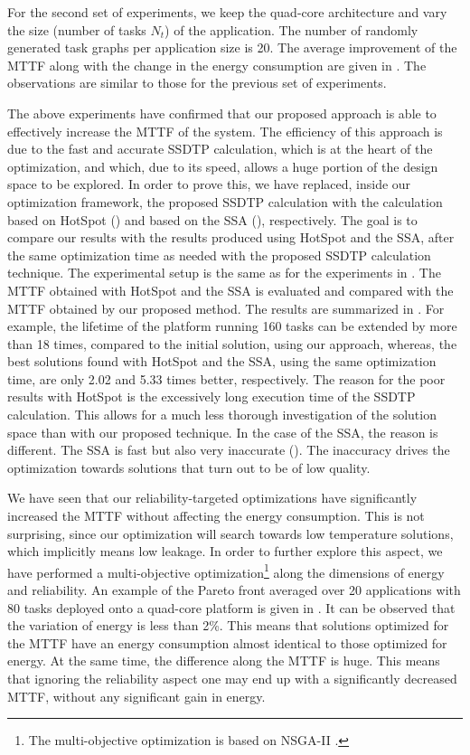 For the second set of experiments, we keep the quad-core architecture and vary
the size (number of tasks $N_t$) of the application. The number of randomly
generated task graphs per application size is 20. The average improvement of the
MTTF along with the change in the energy consumption are given in
. The observations are similar to those for the previous set of
experiments.

The above experiments have confirmed that our proposed approach is able to
effectively increase the MTTF of the system. The efficiency of this approach is
due to the fast and accurate SSDTP calculation, which is at the heart of the
optimization, and which, due to its speed, allows a huge portion of the design
space to be explored. In order to prove this, we have replaced, inside our
optimization framework, the proposed SSDTP calculation with the calculation
based on HotSpot () and based on the SSA
(), respectively. The goal is to compare
our results with the results produced using HotSpot and the SSA, after the same
optimization time as needed with the proposed SSDTP calculation technique. The
experimental setup is the same as for the experiments in
. The MTTF obtained with HotSpot and the SSA is evaluated
and compared with the MTTF obtained by our proposed method. The results are
summarized in . For example, the lifetime of the
platform running 160 tasks can be extended by more than 18 times, compared to
the initial solution, using our approach, whereas, the best solutions found with
HotSpot and the SSA, using the same optimization time, are only 2.02 and 5.33
times better, respectively. The reason for the poor results with HotSpot is the
excessively long execution time of the SSDTP calculation. This allows for a much
less thorough investigation of the solution space than with our proposed
technique. In the case of the SSA, the reason is different. The SSA is fast but
also very inaccurate (). The inaccuracy
drives the optimization towards solutions that turn out to be of low quality.

We have seen that our reliability-targeted optimizations have significantly
increased the MTTF without affecting the energy consumption. This is not
surprising, since our optimization will search towards low temperature
solutions, which implicitly means low leakage. In order to further explore this
aspect, we have performed a multi-objective optimization\footnote{The
multi-objective optimization is based on NSGA-II \cite{deb2002}.} along the
dimensions of energy and reliability. An example of the Pareto front averaged
over 20 applications with 80 tasks deployed onto a quad-core platform is given
in . It can be observed that the variation of energy
is less than 2\%. This means that solutions optimized for the MTTF have an
energy consumption almost identical to those optimized for energy. At the same
time, the difference along the MTTF is huge. This means that ignoring the
reliability aspect one may end up with a significantly decreased MTTF, without
any significant gain in energy.

